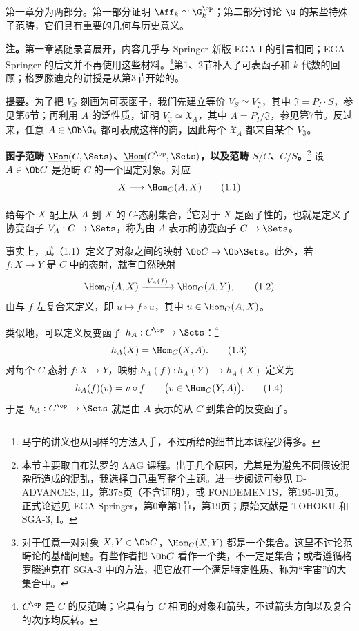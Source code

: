 第一章分为两部分。第一部分证明 $\Aff_k\simeq\G_k^{\op}$；第二部分讨论 $\G$ 的某些特殊子范畴，它们具有重要的几何与历史意义。

\textbf{注。}第一章紧随录音展开，内容几乎与 Springer 新版 EGA-I 的引言相同；EGA-Springer 的后文并不再使用这些材料。\footnote{马宁的讲义也从同样的方法入手，不过所给的细节比本课程少得多。}第1、2节补入了可表函子和 $k$-代数的回顾；格罗滕迪克的讲授是从第3节开始的。

\textbf{提要。}为了把 $V_S$ 刻画为可表函子，我们先建立等价 $V_S\simeq V_{\mathfrak J}$，其中 $\mathfrak J=P_I\cdot S$，参见第6节；再利用 $A$ 的泛性质，证明 $V_{\mathfrak J}\simeq\mathfrak X_A$，其中 $A=P_I/\mathfrak J$，参见第7节。反过来，任意 $A\in\Ob\G_k$ 都可表成这样的商，因此每个 $\mathfrak X_A$ 都来自某个 $V_{\mathfrak J}$。

\textbf{函子范畴 $\underline{\Hom}(C,\Sets)$、$\underline{\Hom}(C^{\op},\Sets)$，以及范畴 $S/C$、$C/S$。}\footnote{本节主要取自布法罗的 AAG 课程。出于几个原因，尤其是为避免不同假设混杂所造成的混乱，我选择自己重写整个主题。进一步阅读可参见 D-ADVANCES, II，第378页（不含证明），或 FONDEMENTS，第195-01页。正式论述见 EGA-Springer，第0章第1节，第19页；原始文献是 TOHOKU 和 SGA-3, I。}
设 $A\in\Ob C$ 是范畴 $C$ 的一个固定对象。对应
\[
X\longmapsto\Hom_C(A,X)\tag{1.1}
\]

给每个 $X$ 配上从 $A$ 到 $X$ 的 $C$-态射集合，\footnote{对于任意一对对象 $X,Y\in\Ob C$，$\Hom_C(X,Y)$ 都是一个集合。这里不讨论范畴论的基础问题。有些作者把 $\Ob C$ 看作一个类，不一定是集合；或者遵循格罗滕迪克在 SGA-3 中的方法，把它放在一个满足特定性质、称为“宇宙”的大集合中。}它对于 $X$ 是函子性的，也就是定义了协变函子 $V_A:C\to\Sets$，称为由 $A$ 表示的协变函子 $C\to\Sets$。

事实上，式（1.1）定义了对象之间的映射 $\Ob C\to\Ob\Sets$。此外，若 $f:X\to Y$ 是 $C$ 中的态射，就有自然映射
\[
\Hom_C(A,X)\xrightarrow{\ V_A(f)\ }\Hom_C(A,Y),\tag{1.2}
\]
由与 $f$ 左复合来定义，即 $u\mapsto f\circ u$，其中 $u\in\Hom_C(A,X)$。

类似地，可以定义反变函子 $h_A:C^{\op}\to\Sets$：\footnote{$C^{\op}$ 是 $C$ 的反范畴；它具有与 $C$ 相同的对象和箭头，不过箭头方向以及复合的次序均反转。}
\[
h_A(X)=\Hom_C(X,A).\tag{1.3}
\]
对每个 $C$-态射 $f:X\to Y$，映射 $h_A(f):h_A(Y)\to h_A(X)$ 定义为
\[
h_A(f)(v)=v\circ f\qquad\bigl(v\in\Hom_C(Y,A)\bigr).\tag{1.4}
\]
于是 $h_A:C^{\op}\to\Sets$ 就是由 $A$ 表示的从 $C$ 到集合的反变函子。

